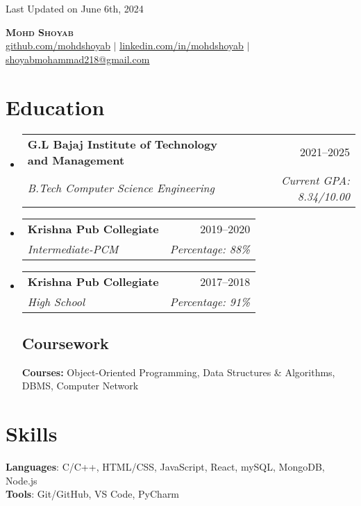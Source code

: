 \documentclass[letterpaper,11pt]{article}
\makeatletter
\newcommand{\resumeSubheading}[4]{
  \vspace{-2pt}\item
    \begin{tabular*}{0.97\textwidth}[t]{l@{\extracolsep{\fill}}r}
      \textbf{#1} & #2 \\
      \textit{\small#3} & \textit{\small #4} \\
    \end{tabular*}\vspace{-4pt}
}
\newcommand{\resumeSubHeadingListStart}{\begin{itemize}[leftmargin=0.15in, label={}]}
\newcommand{\resumeSubHeadingListEnd}{\end{itemize}}
\makeatother
\begin{document}
\begin{flushright}
  \color{gray}
  \small Last Updated on June 6th, 2024
\end{flushright}

\vspace{-5pt}

\begin{center}
    \textbf{\Huge \scshape Mohd Shoyab} \\ \vspace{8pt}
    \small 
     \href{https://github.com/mohdshoyab7}{\underline{github.com/mohdshoyab}} $|$ 
     \href{https://linkedin.com/in/mohd-shoyab-aman-75703b252}{\underline{linkedin.com/in/mohdshoyab}} $|$ 
     \href{mailto:shoyabmohammad218@gmail.com}{\underline{shoyabmohammad218@gmail.com}}
\end{center}

\section{Education}
  \resumeSubHeadingListStart
  
    \resumeSubheading
      {G.L Bajaj Institute of Technology and Management}{2021--2025}
      {B.Tech Computer Science Engineering}{Current GPA: 8.34/10.00}
      
    \resumeSubheading
      {Krishna Pub Collegiate}{2019--2020}
      {Intermediate-PCM}{Percentage: 88\%}

    \resumeSubheading
      {Krishna Pub Collegiate}{2017--2018}
      {High School}{Percentage: 91\%}
   
    \vspace{-10pt}
    \subsection{Coursework}
      \textbf{Courses:} Object-Oriented Programming, Data Structures \& Algorithms, DBMS, Computer Network
  \resumeSubHeadingListEnd

\section{Skills}
 \begin{itemize}[leftmargin=0.15in, label={}]
    \small{\item{
     \textbf{Languages}{: C/C++, HTML/CSS, JavaScript, React, mySQL, MongoDB, Node.js} \\
     \textbf{Tools}{: Git/GitHub, VS Code, PyCharm}
    }}
 \end{itemize}
\end{document}
